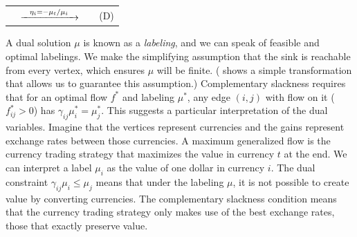 \documentclass[11pt]{article}
\theoremstyle{definition}
\theoremstyle{definition}
\newcommand{\R}{\mathbb{R}}
\newcommand{\gij}{\gamma_{ij}}
\begin{document}
	\begin{tabular}{rcll}
		\hspace*{-1.05cm}
	\resizebox{0.37\textwidth}{!}{
		\fbox{
	\begin{minipage}{0.35\textwidth}
	\begin{alignat*}{4}
    \text{min} &\quad &\sum_{i \in V \setminus t} b_i \eta_i \\
    \text{s.t.}
    &   &\gij \eta_j - \eta_i &\geq 0 \quad &&\forall\; &&(i, j) \in E \\
    &   &                     &             &&          &&\ i, j \neq t \\
    &   &\gamma_{ti} \eta_i &= -1 \quad     &&\forall\; &&(i, t) \in E \\
    &   &\eta_i &= -\gamma_{it} \quad       &&\forall\; &&(t, i) \in E \\
    &   &\eta_i &\leq 0 \quad               &&\forall\; &&i \in V \setminus t
    \end{alignat*}
	\end{minipage}
}
} & 
	$\xrightarrow{\hspace*{0.25cm}\eta_i = - \mu_t / \mu_i\hspace*{0.25cm}}$
	&
	\resizebox{0.37\textwidth}{!}{
		\fbox{
	\begin{minipage}{0.4\textwidth}
    \begin{alignat*}{3}
    \text{max} &\quad &\mu_t &\sum_{j \in V \setminus t} \frac{b_j}{\mu_j}  \\
    \text{s.t.}
    &   &\gij \mu_i &\leq \mu_j \quad &&\forall\; (i, j) \in E \\
    &   &\mu_i &\in \R_{>0} \cup \infty \quad &&\forall\; i \in V \setminus t \\
    &   &\mu_t &\in \R_{>0}
    \end{alignat*}
	\end{minipage}
}
} & \hspace*{0.4cm}(D)
\end{tabular}
\vspace{0.5cm}

        
	A dual solution $\mu$ is known as a \emph{labeling}, and we can speak of feasible and
	optimal labelings. We make the simplifying assumption that the sink is reachable from every vertex, which ensures $\mu$ will be finite. (\cite{Olver2017} shows a simple transformation that allows us to guarantee this assumption.) 
	Complementary slackness requires that for an optimal flow $f^*$ and labeling $\mu^*$,
	any edge $(i, j)$ with flow on it ($f^*_{ij} > 0$) has $\gamma_{ij}\mu^*_i = \mu^*_j$.
	This suggests a particular interpretation of the dual variables. Imagine that
	the vertices represent currencies and the gains represent exchange rates between those currencies.
	A maximum generalized flow is the currency trading strategy that maximizes the value in currency
	$t$ at the end. We can interpret a label $\mu_i$ as the value of one dollar in currency $i$.
	The dual constraint $\gamma_{ij} \mu_i \leq \mu_j$ means that under the labeling $\mu$,
	it is not possible to create value by converting currencies.
	The complementary slackness condition means that the currency trading strategy
	only makes use of the best exchange rates, those that exactly preserve value.
	
\end{document}
